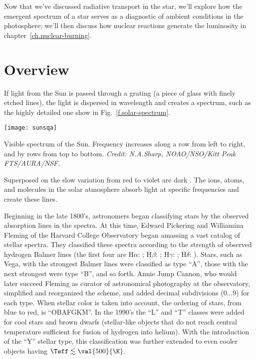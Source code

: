 
\nocite{Mihalas1978Stellar-Atmosph,LeBlanc2010An-Introduction,Carroll2006An-Introduction}

Now that we've discussed radiative transport in the star, we'll explore how the emergent spectrum of a star serves as a diagnostic of ambient conditions in the photosphere; we'll then discuss how nuclear reactions generate the luminosity in chapter~\ref{ch.nuclear-burning}.

\section{Overview}

If light from the Sun is passed through a grating (a piece of glass with finely etched lines), the light is dispersed in wavelength and creates a spectrum, such as the highly detailed one show in Fig.~\ref{f.solar-spectrum}. 
\begin{marginfigure}
\texttt{[image: sunsqa]}
\caption[Visible spectrum of the sun]{\label{f.solar-spectrum} Visible spectrum of the Sun. Frequency increases along a row from left to right, and by rows from top to bottom. \emph{Credit:
N.A.Sharp, NOAO/NSO/Kitt Peak FTS/AURA/NSF.}}
\end{marginfigure}
Superposed on the slow variation from red to violet are dark . The ions, atoms, and molecules in the solar atmosphere absorb light at specific frequencies and create these lines.

Beginning in the late 1800's, astronomers began classifying stars by the observed absorption lines in the spectra. At this time, Edward Pickering and Williamina Fleming of the Harvard College Observatory began amassing a vast catalog of stellar spectra. They classified these spectra according to the strength of observed hydrogen Balmer lines (the first four are H$\alpha$: ; H$\beta$: ; H$\gamma$: ; H$\delta$: ). Stars, such as Vega, with the strongest Balmer lines were classified as type ``A'', those with the next strongest were type ``B'', and so forth. Annie Jump Cannon, who would later succeed Fleming as curator of astronomical photography at the observatory, simplified and reorganized the scheme, and added decimal subdivisions ($0\ldots9$) for each type. When stellar color is taken into account, the ordering of stars, from blue to red, is ``OBAFGKM''. In the 1990's the ``L'' and ``T'' classes were added\cite{Kirkpatrick1999Dwarfs-Cooler-t} for cool stars and brown dwarfs (stellar-like objects that do not reach central temperature sufficient for fusion of hydrogen into helium). With the introduction of the ``Y'' stellar type\cite{Cushing2011The-Discovery-o}, this classification was further extended to even cooler objects having $\Teff\lesssim\val{500}{\K}$.

